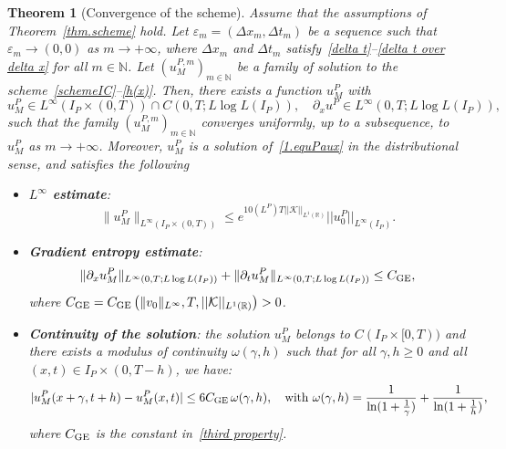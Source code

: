 \documentclass[11pt]{amsart}
\newtheorem{theorem}{Theorem}
\newcommand{\N}{\mathbb{N}}
\newcommand{\eps}{\varepsilon}
\begin{document}
\begin{theorem}[Convergence of the scheme]\label{convergence in periodic} 
Assume that the assumptions of Theorem~\ref{thm.scheme} hold. Let $\eps_m=(\Delta x_m, \Delta t_m)$ be a sequence such that $\eps_m \to (0,0)$ as $m \to +\infty$, where $\Delta x_m$ and $\Delta t_m$ satisfy~\eqref{delta t}--\eqref{delta t over delta x} for all $m \in \mathbb{N}$. Let $(u^{P,m}_M)_{m\in\N}$ be a family of solution to the scheme~\eqref{schemeIC}--\eqref{h(x)}. Then, there exists a function $u^P_M$ with
\begin{equation}\label{first property}
     u^P_M \in L^{\infty}(I_P\times (0, T)) \cap C(0, T; L \log L(I_P)), \quad \partial_x u^P  \in L^{\infty}(0, T;  L \log L(I_P)),
 \end{equation}
such that the family $(u^{P,m}_M)_{m\in\N}$ converges uniformly, up to a subsequence, to $u^P_M$ as $m\to +\infty$.
Moreover, $u^P_M$ is a solution of~\eqref{1.equPaux} in the distributional sense, and satisfies the following
\begin{itemize}
\item {\bf $L^{\infty}$ estimate}:
\begin{equation}\label{second property}
     \|u^P_M \|_{L^{\infty}(I_P \times(0, T))} \leq e^{10(L^P) T ||\mathcal{K}||_{L^1(\mathbb{R})}} ||u_0^P||_{L^{\infty}(I_P)}.
\end{equation}
\item {\bf Gradient entropy estimate}: 
\begin{equation}\label{third property}
   \|\partial_x u^P_M \|_{L^{\infty}(0, T; L \log L (I_P) )} + \|\partial_t u^P_M \|_{L^{\infty}(0, T; L \log L (I_P) )} \leq C_{\rm GE}, 
\end{equation}
where $C_{\rm GE}=C_{\rm GE}\left(\|v_0 \|_{L^{\infty}}, T, ||\mathcal{K}||_{L^1(\mathbb{R})}\right) > 0$.\smallskip
 \item {\bf Continuity of the solution}: the solution $u^P_M$ belongs to $C(I_P\times [0,T))$ and there exists a modulus of continuity $\omega(\gamma,h)$ such that for all $\gamma, h \geq 0$ and all $(x, t) \in I_P \times (0, T-h )$, we have:
 \begin{align}\label{mod.cont.period}
|u^P_M (x + \gamma,t+h) - u^P_M (x,t)| \leq 6 C_{\rm GE}\, \omega(\gamma,h), \quad \mbox{with } \omega(\gamma, h) =\frac{1}{\ln(1+ \frac{1}{\gamma})}+ \frac{1}{\ln(1 + \frac{1}{h})},
\end{align}
where $C_{\rm GE}$ is the constant in~\eqref{third property}.
 \end{itemize}
\end{theorem}
\end{document}
